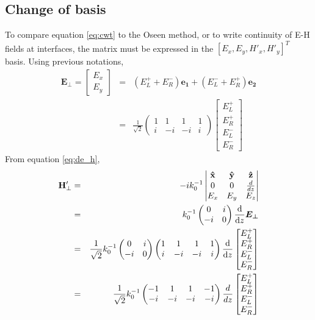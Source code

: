 \subsection{Change of basis}

To compare equation \ref{eq:cwt} to the Oseen method, or to write continuity of E-H fields at interfaces, the matrix must be expressed in the $[E_x, E_y, H'_x, H'_y]^T$ basis. Using previous notations,
\begin{eqnarray}
\bm{E_\perp}=\begin{bmatrix}
E_x\\E_y
\end{bmatrix} &=& \left(E_L^+ + E_R^-\right)\bm{e_1} + \left(E_L^- + E_R^+\right)\bm{e_2} \\
&=& \frac{1}{\sqrt{2}}\begin{pmatrix}
1 & 1 & 1 & 1\\
i &-i &-i & i 
\end{pmatrix}\begin{bmatrix}
E_L^+\\E_R^+\\E_L^-\\E_R^-
\end{bmatrix}
\end{eqnarray}
From equation \ref{eq:de_h}, 
\begin{eqnarray}
\mathbf{H_\perp^\prime} &=& -ik_0^{-1} \begin{vmatrix}
\mathbf{\hat{x}} & \mathbf{\hat{y}} & \mathbf{\hat{z}}\\
0 & 0 & \frac{d}{dz}\\
E_x & E_y & E_z
\end{vmatrix}\\ 
&=& k_0^{-1} \begin{pmatrix}
0 & i\\-i & 0
\end{pmatrix}\dv{z}\bm{E_\perp} \\
&=& \frac{1}{\sqrt{2}}k_0^{-1} \begin{pmatrix}
0 & i\\-i & 0
\end{pmatrix}\begin{pmatrix}
1 & 1 & 1 & 1\\
i &-i &-i & i 
\end{pmatrix}\dv{z}\begin{bmatrix}
E_L^+\\E_R^+\\E_L^-\\E_R^-
\end{bmatrix}\\
&=& \frac{1}{\sqrt{2}}k_0^{-1} \begin{pmatrix}-1 & 1 & 1 & -1\\-i & -i & -i & -i\end{pmatrix}\frac{d}{dz}\begin{bmatrix}
E_L^+\\E_R^+\\E_L^-\\E_R^-
\end{bmatrix}
\end{eqnarray}
